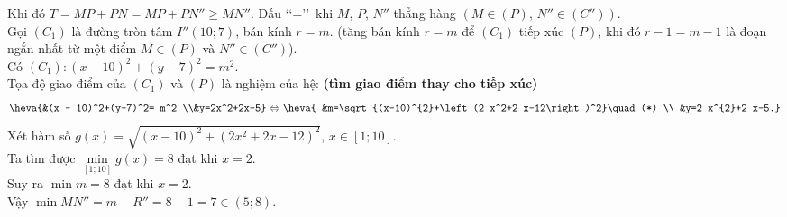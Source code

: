 \begin{ex}
{\begin{center}
\end{center}
Khi đó $T=MP+PN=M P+PN''\geq M N''$. Dấu \lq\lq  =\rq\rq\, khi $M$, $P$, $N''$ thẳng hàng $\left(M \in(P),\,N'' \in\left(C''\right)\right)$.\\
Gọi $\left(C_1\right)$ là đường tròn tâm $I''(10 ; 7)$, bán kính $r=m$. (tăng bán kính $r=m$ để $\left(C_1\right)$ tiếp xúc $(P)$, khi đó $r-1=m-1$ là đoạn ngắn nhất từ một điểm $M \in(P)$ và $N'' \in\left(C''\right)$).\\
Có $\left(C_1\right)\colon (x-10)^{2}+(y-7)^2=m^{2}$.\\
Tọa độ giao điểm của $\left(C_1\right)$ và $(P)$ là nghiệm của hệ: {\bf (tìm giao điểm thay cho tiếp xúc)}
\[\heva{&(x - 10)^2+(y-7)^2= m^2 \\&y=2x^2+2x-5}
\Leftrightarrow \heva{
&m=\sqrt{(x-10)^{2}+\left(2 x^2+2 x-12\right)^2}\quad(*) \\
&y=2 x^{2}+2 x-5.}\]
Xét hàm số $ g(x)=\sqrt{(x-10)^{2}+\left(2 x^2+2 x-12\right)^2} $, $x \in[1;10]$.\\
Ta tìm được $ \min \limits_{[1;10]} g(x)=8$ đạt khi $x=2$.\\
Suy ra $ \min m=8$ đạt khi $x=2$.\\
Vậy $\min MN''=m-R''=8-1=7 \in(5;8)$.
}
\end{ex}

